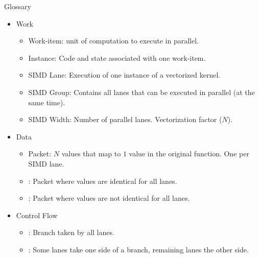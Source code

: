 \begin{frame}{Glossary}

\begin{itemize}
    \item Work
    \begin{itemize}
        \item Work-item: unit of computation to execute in parallel.
        \item Instance: Code and state associated with one work-item.
        \item SIMD Lane: Execution of one instance of a vectorized kernel.
        \item SIMD Group: Contains all lanes that can be executed in parallel (at the same time).
        \item SIMD Width: Number of parallel lanes. Vectorization factor ($N$).
    \end{itemize}
        
    \item Data
    \begin{itemize}
        \item Packet: $N$ values that map to $1$ value in the original function. One per SIMD lane.
        \item {}: Packet where values are identical for all lanes.
        \item {}: Packet where values are not identical for all lanes.
    \end{itemize}

    \item Control Flow
    \begin{itemize}
        \item {}: Branch taken by all lanes.
        \item {}: Some lanes take one side of a branch, remaining lanes the other side.
    \end{itemize}
\end{itemize}

\end{frame}
